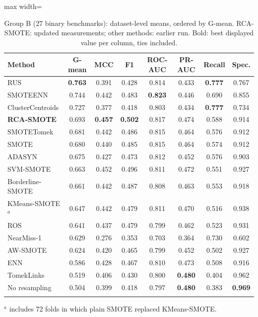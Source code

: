 \begin{table}[!htb]
\caption{Group B (27 binary benchmarks): dataset-level means, ordered by G-mean. RCA-SMOTE: updated measurements; other methods: earlier run. Bold: best displayed value per column, ties included.}\label{tab:groupB}
\centering\tabfont
\begin{adjustbox}{max width=\textwidth}
\begin{tabular}{@{}lccccccc@{}}
\toprule
Method & G-mean & MCC & F1 & ROC-AUC & PR-AUC & Recall & Spec. \\
\midrule
RUS & \textbf{0.763} & 0.391 & 0.428 & 0.814 & 0.433 & \textbf{0.777} & 0.767 \\
SMOTEENN & 0.744 & 0.442 & 0.483 & \textbf{0.823} & 0.446 & 0.690 & 0.855 \\
ClusterCentroids & 0.727 & 0.377 & 0.418 & 0.803 & 0.434 & \textbf{0.777} & 0.734 \\
\textbf{RCA-SMOTE} & 0.693 & \textbf{0.457} & \textbf{0.502} & 0.817 & 0.474 & 0.588 & 0.914 \\
SMOTETomek & 0.681 & 0.442 & 0.486 & 0.815 & 0.464 & 0.576 & 0.912 \\
SMOTE & 0.680 & 0.440 & 0.485 & 0.815 & 0.464 & 0.574 & 0.912 \\
ADASYN & 0.675 & 0.427 & 0.473 & 0.812 & 0.452 & 0.576 & 0.903 \\
SVM-SMOTE & 0.663 & 0.452 & 0.496 & 0.811 & 0.472 & 0.551 & 0.927 \\
Borderline-SMOTE & 0.661 & 0.442 & 0.487 & 0.808 & 0.463 & 0.553 & 0.918 \\
KMeans-SMOTE$^{a}$ & 0.647 & 0.442 & 0.479 & 0.811 & 0.470 & 0.516 & 0.938 \\
ROS & 0.641 & 0.437 & 0.479 & 0.799 & 0.462 & 0.523 & 0.931 \\
NearMiss-1 & 0.629 & 0.276 & 0.353 & 0.703 & 0.364 & 0.730 & 0.602 \\
AW-SMOTE & 0.624 & 0.420 & 0.465 & 0.799 & 0.452 & 0.502 & 0.927 \\
ENN & 0.586 & 0.428 & 0.467 & 0.810 & 0.473 & 0.508 & 0.916 \\
TomekLinks & 0.519 & 0.406 & 0.430 & 0.800 & \textbf{0.480} & 0.404 & 0.962 \\
No resampling & 0.504 & 0.399 & 0.418 & 0.797 & \textbf{0.480} & 0.383 & \textbf{0.969} \\
\botrule
\end{tabular}
\end{adjustbox}
\par\smallskip\raggedright\footnotesize $^{a}$ includes 72 folds in which plain SMOTE replaced KMeans-SMOTE.
\end{table}
